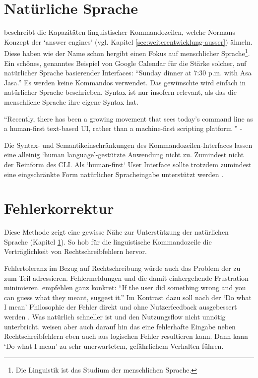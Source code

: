 \documentclass[oneside,bibliography=totocnumbered,BCOR=5mm]{scrbook}
\begin{document}
\section{Natürliche Sprache}
\label{sec:natural-lang}

\textcite{Raskin_2008} beschreibt die Kapazitäten linguistischer
Kommandozeilen, welche Normans Konzept der `answer engines' (vgl. Kapitel
\ref{sec:weiterentwicklung-ausser}) ähneln. Diese haben wie der Name schon
hergibt einen Fokus auf menschlicher Sprache\footnote{Die Linguistik ist das
Studium der menschlichen Sprache.}. Ein schönes, genanntes Beispiel von Google
Calendar für die Stärke solcher, auf natürlicher Sprache basierender Interfaces:
``Sunday dinner at 7:30 p.m. with Asa Jasa.'' Es werden keine Kommandos
verwendet. Das gewünschte wird einfach in natürlicher Sprache beschrieben.
Syntax ist nur insofern relevant, als das die menschliche Sprache ihre eigene
Syntax hat.

``Recently, there has been a growing movement that sees today's command line
as a human-first text-based UI, rather than a machine-first scripting platform
\parencite{clig}'' - \parencite{Schr_der_2021}

Die Syntax- und Semantikeinschränkungen des Kommandozeilen-Interfaces lassen
eine alleinig `human language'-gestützte Anwendung nicht zu. Zumindest nicht
der Reinform des CLI. Als `human-first` User Interface sollte trotzdem
zumindest eine eingschränkte Form natürlicher Spracheingabe unterstützt werden
\parencite{seneviratne2008new}.


\section{Fehlerkorrektur}

Diese Methode zeigt eine gewisse Nähe zur Unterstützung der natürlichen
Sprache (Kapitel \ref{sec:natural-lang}). So hob \textcite{Raskin_2008} für die
linguistische Kommandozeile die Verträglichkeit von Rechtschreibfehlern hervor.

Fehlertoleranz im Bezug auf Rechtschreibung würde auch das Problem der zu
 zum Teil adressieren. Fehlermeldungen und die damit
einhergehende Frustration minimieren. \textcite{clig} empfehlen ganz konkret: ``If
the user did something wrong and you can guess what they meant, suggest it.''
Im Kontrast dazu soll nach der `Do what I mean' Philosophie der Fehler direkt
und ohne Nutzerfeedback ausgebessert werden \parencite{DWIM}. Was natürlich
schneller ist und den Nutzungsflow nicht unnötig unterbricht. \textcite{clig} weisen
aber auch darauf hin das eine fehlerhafte Eingabe neben Rechtschreibfehlern eben
auch aus logischen Fehler resultieren kann. Dann kann `Do what I mean' zu sehr
unerwartetem, gefährlichem Verhalten führen.
\end{document}
